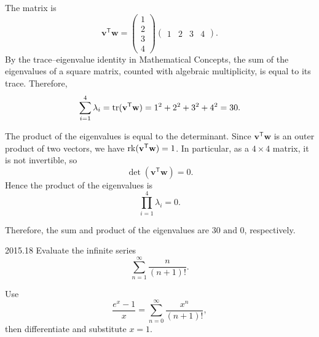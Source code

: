     \begin{solution}
        The matrix is
        \[
            \mathbf{v}^{\mathsf T}\mathbf{w}
            =
            \begin{pmatrix}
                1 \\
                2 \\
                3 \\
                4
            \end{pmatrix}
            \begin{pmatrix}
                1 & 2 & 3 & 4
            \end{pmatrix}.
        \]
        By the trace--eigenvalue identity in Mathematical Concepts, the sum of the eigenvalues of a square matrix, counted with algebraic multiplicity, is equal
        to its trace. Therefore,
        \[
            \sum_{i=1}^{4}\lambda_i
            =
            \operatorname{tr}(\mathbf{v}^{\mathsf T}\mathbf{w})
            =
            1^2+2^2+3^2+4^2
            =
            30.
        \]

        The product of the eigenvalues is equal to the determinant. Since $\mathbf{v}^{\mathsf
        T}\mathbf{w}$ is an outer product of two vectors, we have $\operatorname{rk}(\mathbf{v}^{\mathsf
        T}\mathbf{w})=1$. In particular, as a $4\times 4$ matrix, it is not invertible, so
        \[
            \det(\mathbf{v}^{\mathsf T}\mathbf{w})=0.
        \]
        Hence the product of the eigenvalues is
        \[
            \prod_{i=1}^{4}\lambda_i=0.
        \]

        Therefore, the sum and product of the eigenvalues are $\boxed{30\text{ and }0}$,
        respectively.
    \end{solution}

    \begin{pastproblem}{2015.18}
        Evaluate the infinite series
        \[
            \sum_{n=1}^{\infty}\frac{n}{(n+1)!}.
        \]

        \begin{hint}
            Use
            \[
                \frac{e^x-1}{x}
                =
                \sum_{n=0}^{\infty}\frac{x^n}{(n+1)!},
            \]
            then differentiate and substitute $x=1$.
        \end{hint}
    \end{pastproblem}

